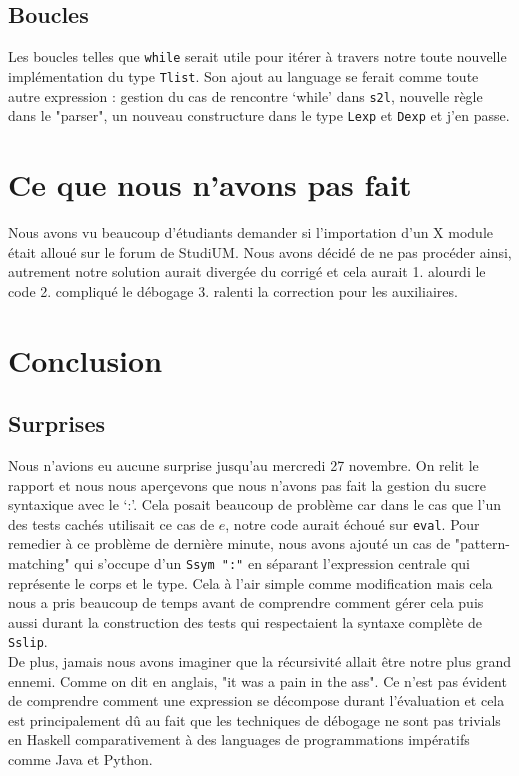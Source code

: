 \documentclass[a4paper,12pt]{article}
\begin{document}
    \subsection{Boucles}
        Les boucles telles que \texttt{while} serait utile pour itérer à travers notre toute 
        nouvelle implémentation du type \texttt{Tlist}. Son ajout au language se ferait comme 
        toute autre expression : gestion du cas de rencontre `while' dans \texttt{s2l}, nouvelle
        règle dans le "parser", un nouveau constructure dans le type \texttt{Lexp} et \texttt{Dexp}
        et j'en passe.

\section{Ce que nous n'avons pas fait}
    Nous avons vu beaucoup d'étudiants demander si l'importation d'un
    X module était alloué sur le forum de StudiUM. Nous avons décidé
    de ne pas procéder ainsi, autrement notre solution aurait divergée
    du corrigé et cela aurait 1. alourdi le code 2. compliqué le 
    débogage 3. ralenti la correction pour les auxiliaires.

\newpage
\section{Conclusion}
    \subsection{Surprises}
        Nous n'avions eu aucune surprise jusqu'au mercredi 27 novembre. On relit le 
        rapport et nous nous aperçevons que nous n'avons pas fait la gestion du sucre
        syntaxique avec le `:'. Cela posait beaucoup de problème car dans le cas que
        l'un des tests cachés utilisait ce cas de $e$, notre code aurait échoué sur
        \texttt{eval}. Pour remedier à ce problème de dernière minute, nous avons 
        ajouté un cas de "pattern-matching" qui s'occupe d'un \texttt{Ssym ":"} en 
        séparant l'expression centrale qui représente le corps et le type. Cela à
        l'air simple comme modification mais cela nous a pris beaucoup de temps avant
        de comprendre comment gérer cela puis aussi durant la construction des tests 
        qui respectaient la syntaxe complète de \texttt{Sslip}. \\

        De plus, jamais nous avons imaginer que la récursivité allait être notre
        plus grand ennemi. Comme on dit en anglais, "it was a pain in the ass". Ce
        n'est pas évident de comprendre comment une expression se décompose durant
        l'évaluation et cela est principalement dû au fait que les techniques de 
        débogage ne sont pas trivials en Haskell comparativement à des languages
        de programmations impératifs comme Java et Python.
\end{document}
